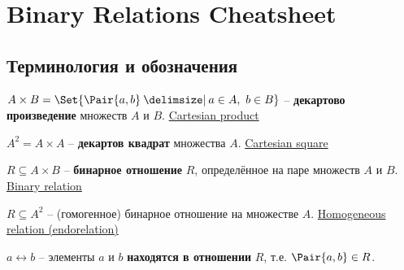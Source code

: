 \documentclass[a4paper,10pt]{article}
\begin{document}
\setcounter{section}{1}
\section{Binary Relations Cheatsheet}

\subsection{Терминология и обозначения}

\begin{terms}
    \item $A \times B = \Set{\Pair{a,b} \given a \in A,~ b \in B}$ -- \textbf{декартово произведение} множеств $A$ и $B$.
    \hfill\href{https://en.wikipedia.org/wiki/Cartesian_product}{Cartesian product}

    \item $A^2 = A \times A$ -- \textbf{декартов квадрат} множества $A$.
    \hfill\href{https://en.wikipedia.org/wiki/Cartesian_product\#n-ary_Cartesian_power}{Cartesian square}

    \item $R \subseteq A \times B$ -- \textbf{бинарное отношение} $R$, определённое на паре множеств $A$ и $B$.
    \hfill\href{https://en.wikipedia.org/wiki/Binary_relation}{Binary relation}

    \item $R \subseteq A^2$ -- (гомогенное) бинарное отношение на множестве $A$.
    \hfill\href{https://en.wikipedia.org/wiki/Homogeneous_relation}{Homogeneous relation (endorelation)}

    \item $a \rel b$ -- элементы $a$ и $b$ \textbf{находятся в отношении} $R$, т.е. $\Pair{a,b} \in R$.




\end{terms}
\end{document}
